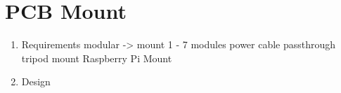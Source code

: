 \section{PCB Mount}

\begin{enumerate}
  \item Requirements
  \subitem modular -> mount 1 - 7 modules
  \subitem power cable passthrough
  \subitem tripod mount
  \subitem Raspberry Pi Mount
  \item Design
\end{enumerate}